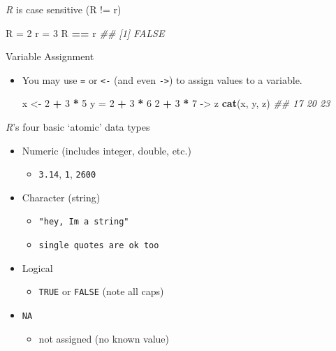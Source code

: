 \documentclass[]{book}
\newenvironment{Shaded}{\begin{snugshade}}{\end{snugshade}}
\newcommand{\CommentTok}[1]{\textcolor[rgb]{0.56,0.35,0.01}{\textit{#1}}}
\newcommand{\DecValTok}[1]{\textcolor[rgb]{0.00,0.00,0.81}{#1}}
\newcommand{\KeywordTok}[1]{\textcolor[rgb]{0.13,0.29,0.53}{\textbf{#1}}}
\newcommand{\NormalTok}[1]{#1}
\newcommand{\OperatorTok}[1]{\textcolor[rgb]{0.81,0.36,0.00}{\textbf{#1}}}
\newcommand{\StringTok}[1]{\textcolor[rgb]{0.31,0.60,0.02}{#1}}
\providecommand{\tightlist}{%
  \setlength{\itemsep}{0pt}\setlength{\parskip}{0pt}}
\begin{document}
\emph{R} is case sensitive (R != r)

\begin{Shaded}
\begin{Highlighting}[]
\NormalTok{R =}\StringTok{ }\DecValTok{2}
\NormalTok{r =}\StringTok{ }\DecValTok{3}
\NormalTok{R }\OperatorTok{==}\StringTok{ }\NormalTok{r}
\CommentTok{## [1] FALSE}
\end{Highlighting}
\end{Shaded}

Variable Assignment

\begin{itemize}
\item
  You may use \texttt{=} or \texttt{\textless{}-} (and even \texttt{-\textgreater{}}) to assign values to a variable.

\begin{Shaded}
\begin{Highlighting}[]
\NormalTok{x <-}\StringTok{ }\DecValTok{2} \OperatorTok{+}\StringTok{ }\DecValTok{3} \OperatorTok{*}\StringTok{ }\DecValTok{5}
\NormalTok{y =}\StringTok{  }\DecValTok{2} \OperatorTok{+}\StringTok{ }\DecValTok{3} \OperatorTok{*}\StringTok{ }\DecValTok{6}
\DecValTok{2} \OperatorTok{+}\StringTok{ }\DecValTok{3} \OperatorTok{*}\StringTok{ }\DecValTok{7}\NormalTok{ ->}\StringTok{ }\NormalTok{z}
\KeywordTok{cat}\NormalTok{(x, y, z)}
\CommentTok{## 17 20 23}
\end{Highlighting}
\end{Shaded}
\end{itemize}

\emph{R}'s four basic `atomic' data types

\begin{itemize}
\tightlist
\item
  Numeric (includes integer, double, etc.)

  \begin{itemize}
  \tightlist
  \item
    \texttt{3.14}, \texttt{1}, \texttt{2600}
  \end{itemize}
\item
  Character (string)

  \begin{itemize}
  \tightlist
  \item
    \texttt{"hey,\ I\textquotesingle{}m\ a\ string"}
  \item
    \texttt{\textquotesingle{}single\ quotes\ are\ ok\ too\textquotesingle{}}
  \end{itemize}
\item
  Logical

  \begin{itemize}
  \tightlist
  \item
    \texttt{TRUE} or \texttt{FALSE} (note all caps)
  \end{itemize}
\item
  \texttt{NA}

  \begin{itemize}
  \tightlist
  \item
    not assigned (no known value)
  \end{itemize}
\end{itemize}
\end{document}
